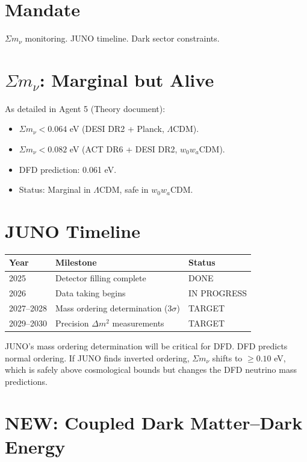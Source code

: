 \documentclass[11pt,a4paper]{article}
\newcommand{\NEW}{\textcolor{dfdblue}{\textbf{NEW}}}
\begin{document}
\section{Mandate}

$\Sigma m_\nu$ monitoring. JUNO timeline. Dark sector constraints.

\section{$\Sigma m_\nu$: Marginal but Alive}

As detailed in Agent 5 (Theory document):
\begin{itemize}
\item $\Sigma m_\nu < 0.064$ eV (DESI DR2 + Planck, $\Lambda$CDM).
\item $\Sigma m_\nu < 0.082$ eV (ACT DR6 + DESI DR2, $w_0 w_a$CDM).
\item DFD prediction: 0.061 eV.
\item Status: Marginal in $\Lambda$CDM, safe in $w_0 w_a$CDM.
\end{itemize}

\section{JUNO Timeline}

\begin{center}
\begin{tabular}{lll}
\toprule
\textbf{Year} & \textbf{Milestone} & \textbf{Status} \\
\midrule
2025 & Detector filling complete & DONE \\
2026 & Data taking begins & IN PROGRESS \\
2027--2028 & Mass ordering determination ($3\sigma$) & TARGET \\
2029--2030 & Precision $\Delta m^2$ measurements & TARGET \\
\bottomrule
\end{tabular}
\end{center}

JUNO's mass ordering determination will be critical for DFD. DFD predicts normal ordering. If JUNO finds inverted ordering, $\Sigma m_\nu$ shifts to $\geq 0.10$ eV, which is safely above cosmological bounds but changes the DFD neutrino mass predictions.

\section{\NEW: Coupled Dark Matter--Dark Energy}
\end{document}
